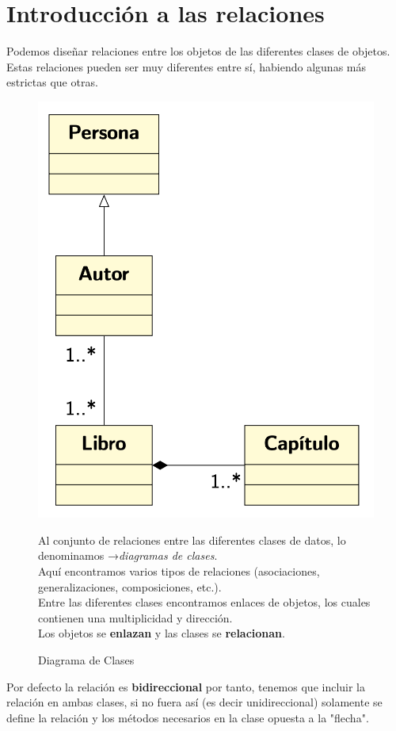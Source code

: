 \thispagestyle{empty}
\cleardoublepage
\chapter{Introducción a las relaciones}
Podemos diseñar relaciones entre los objetos de las diferentes clases de objetos.
Estas relaciones pueden ser muy diferentes entre sí, habiendo algunas más estrictas
que otras.
\vspace*{0.2cm}
\begin{figure}[h]
  \begin{minipage}{0.4\textwidth}
    \includegraphics[width=\textwidth]{Imagenes/intro1.png}
    \caption{Diagrama de Clases}
  \end{minipage}
  \begin{minipage}{0.6\textwidth}
      \vspace{-6\baselineskip} %
    Al conjunto de relaciones entre las diferentes clases de datos, lo denominamos →\textit{diagramas de clases}.\\
    
	Aquí encontramos varios tipos de relaciones (asociaciones, generalizaciones, composiciones, etc.).\\
	
	Entre las diferentes clases encontramos enlaces de objetos, los cuales contienen una multiplicidad y dirección.\\
	
	Los objetos se \textbf{enlazan} y las clases se \textbf{relacionan}.
  \end{minipage}
  
\end{figure}
Por defecto la relación es \textbf{bidireccional} por tanto, tenemos que incluir la relación en ambas clases, si no fuera así (es decir unidireccional) solamente se define la relación y los métodos necesarios en la clase opuesta a la "flecha".